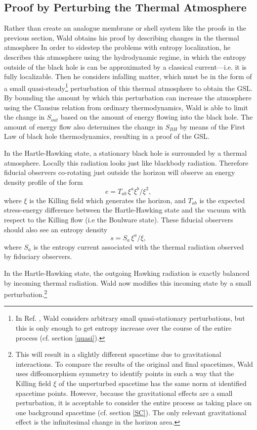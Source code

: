 \documentclass[12pt]{article}
\begin{document}
\subsection{Proof by Perturbing the Thermal Atmosphere}\label{atm}

Rather than create an analogue membrane or shell system like the proofs in the previous section, Wald \cite{wald94} obtains his proof by describing changes in the thermal atmosphere  In order to sidestep the problems with entropy localization, he describes this atmosphere using the hydrodynamic regime, in which the entropy outside of the black hole is can be approximated by a classical current---i.e. it is fully localizable.  Then he considers infalling matter, which must be in the form of a small quasi-steady\footnote{In Ref. \cite{wald94}, Wald considers arbitrary small quasi-stationary perturbations, but this is only enough to get entropy increase over the course of the entire process (cf. section \ref{quasi}).} perturbation of this thermal atmosphere to obtain the GSL.  By bounding the amount by which this perturbation can increase the atmosphere using the Clausius relation from ordinary thermodynamics, Wald is able to limit the change in $S_{out}$ based on the amount of energy flowing into the black hole.  The amount of energy flow also determines the change in $S_{BH}$ by means of the First Law of black hole thermodynamics, resulting in a proof of the GSL.

In the Hartle-Hawking state, a stationary black hole is surrounded by a thermal atmosphere.  Locally this radiation looks just like blackbody radiation.  Therefore fiducial observers co-rotating just outside the horizon will observe an energy density profile of the form
\begin{equation}
e = T_{ab}\,\xi^a \xi^b / \xi^2,
\end{equation}
where $\xi$ is the Killing field which generates the horizon, and $T_{ab}$ is the expected stress-energy difference between the Hartle-Hawking state and the vacuum with respect to the Killing flow (i.e the Boulware state).  These fiducial observers should also see an entropy density
\begin{equation}
s = S_a\,\xi^a / \xi,
\end{equation}
where $S_a$ is the entropy current associated with the thermal radiation observed by fiduciary observers.

In the Hartle-Hawking state, the outgoing Hawking radiation is exactly balanced by incoming thermal radiation.  Wald now modifies this incoming state by a small perturbation.\footnote{This will result in a slightly different spacetime due to gravitational interactions.  To compare the results of the original and final spacetimes, Wald uses diffeomorphism symmetry to identify points in such a way that the Killing field $\xi$ of the unperturbed spacetime has the same norm at identified spacetime points.  However, because the gravitational effects are a small perturbation, it is acceptable to consider the entire process as taking place on one background spacetime (cf. section \ref{SC}).  The only relevant gravitational effect is the infinitesimal change in the horizon area.}
\end{document}
